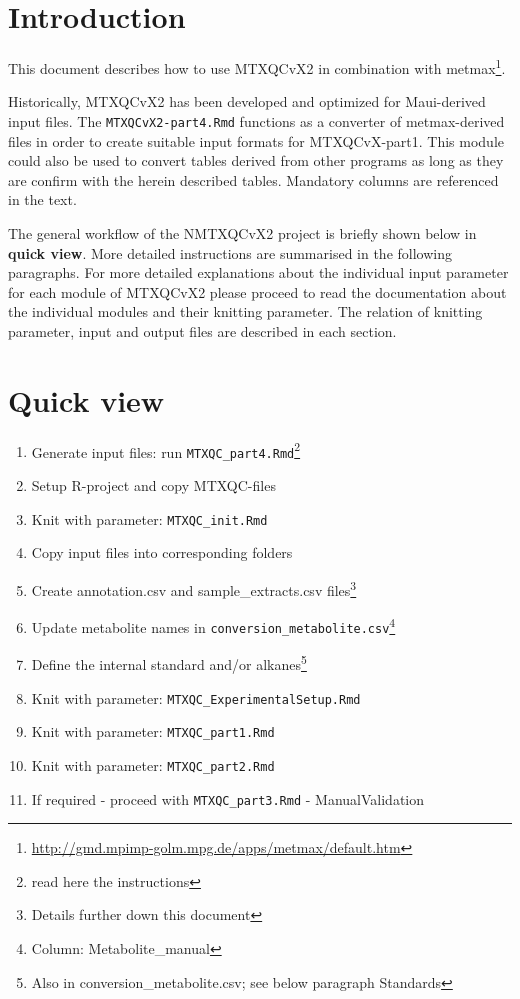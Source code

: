 \documentclass[]{book}
\providecommand{\tightlist}{%
  \setlength{\itemsep}{0pt}\setlength{\parskip}{0pt}}
\let\rmarkdownfootnote\footnote%
\def\footnote{\protect\rmarkdownfootnote}
\theoremstyle{definition}
\theoremstyle{definition}
\theoremstyle{definition}
\theoremstyle{remark}
\begin{document}
\section{Introduction}\label{introduction}

This document describes how to use MTXQCvX2 in combination with
metmax\footnote{\url{http://gmd.mpimp-golm.mpg.de/apps/metmax/default.htm}}.

Historically, MTXQCvX2 has been developed and optimized for Maui-derived
input files. The \texttt{MTXQCvX2-part4.Rmd} functions as a converter of
metmax-derived files in order to create suitable input formats for
MTXQCvX-part1. This module could also be used to convert tables derived
from other programs as long as they are confirm with the herein
described tables. Mandatory columns are referenced in the text.

The general workflow of the NMTXQCvX2 project is briefly shown below in
\textbf{quick view}. More detailed instructions are summarised in the
following paragraphs. For more detailed explanations about the
individual input parameter for each module of MTXQCvX2 please proceed to
read the documentation about the individual modules and their knitting
parameter. The relation of knitting parameter, input and output files
are described in each section.

\section{Quick view}\label{quick-view-1}

\begin{enumerate}
\def\labelenumi{\arabic{enumi}.}
\tightlist
\item
  Generate input files: run \texttt{MTXQC\_part4.Rmd}\footnote{read here
    the instructions}
\item
  Setup R-project and copy MTXQC-files
\item
  Knit with parameter: \texttt{MTXQC\_init.Rmd}
\item
  Copy input files into corresponding folders
\item
  Create annotation.csv and sample\_extracts.csv files\footnote{Details
    further down this document}
\item
  Update metabolite names in
  \texttt{conversion\_metabolite.csv}\footnote{Column:
    Metabolite\_manual}
\item
  Define the internal standard and/or alkanes\footnote{Also in
    conversion\_metabolite.csv; see below paragraph Standards}
\item
  Knit with parameter: \texttt{MTXQC\_ExperimentalSetup.Rmd}
\item
  Knit with parameter: \texttt{MTXQC\_part1.Rmd}
\item
  Knit with parameter: \texttt{MTXQC\_part2.Rmd}
\item
  If required - proceed with \texttt{MTXQC\_part3.Rmd} -
  ManualValidation
\end{enumerate}
\end{document}
